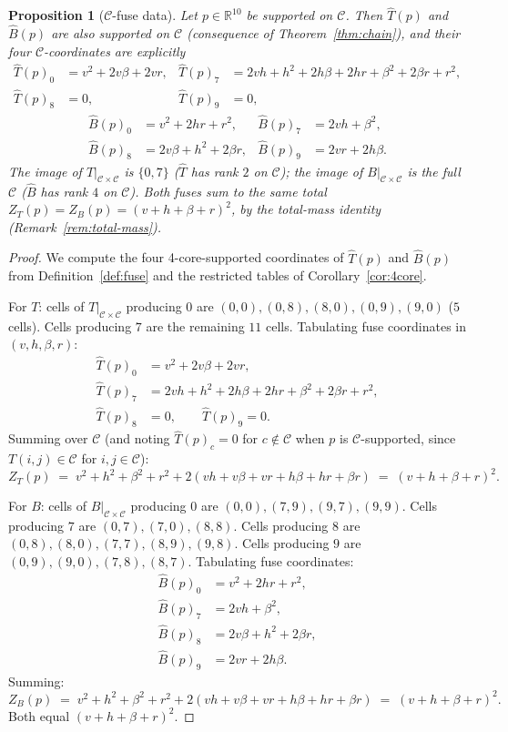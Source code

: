 \documentclass[11pt,reqno]{amsart}
\theoremstyle{plain}
\newtheorem{proposition}[theorem]{Proposition}
\theoremstyle{definition}
\theoremstyle{remark}
\newcommand{\R}{\mathbb{R}}
\newcommand{\Cfour}{\mathcal{C}}
\newcommand{\Tfuse}{\widehat{T}}
\newcommand{\Bfuse}{\widehat{B}}
\begin{document}
\begin{proposition}[$\Cfour$-fuse data]\label{prop:fuse-data}
Let $p\in\R^{10}$ be supported on $\Cfour$. Then
$\Tfuse(p)$ and $\Bfuse(p)$ are also supported on $\Cfour$
(consequence of Theorem~\ref{thm:chain}), and their four
$\Cfour$-coordinates are explicitly
\begin{align*}
\Tfuse(p)_{0} &= v^{2}+2v\beta+2vr,
   & \Tfuse(p)_{7} &= 2vh+h^{2}+2h\beta+2hr+\beta^{2}+2\beta r+r^{2},\\
\Tfuse(p)_{8} &= 0,
   & \Tfuse(p)_{9} &= 0,
\end{align*}
\begin{align*}
\Bfuse(p)_{0} &= v^{2}+2hr+r^{2},
   & \Bfuse(p)_{7} &= 2vh+\beta^{2},\\
\Bfuse(p)_{8} &= 2v\beta+h^{2}+2\beta r,
   & \Bfuse(p)_{9} &= 2vr+2h\beta.
\end{align*}
The image of $T\big|_{\Cfour\times\Cfour}$ is $\{0,7\}$
($\Tfuse$ has rank $2$ on $\Cfour$); the image of
$B\big|_{\Cfour\times\Cfour}$ is the full $\Cfour$ ($\Bfuse$ has
rank $4$ on $\Cfour$). Both fuses sum to the same total
$Z_{T}(p) = Z_{B}(p) = (v+h+\beta+r)^{2}$, by the total-mass
identity (Remark~\ref{rem:total-mass}).
\end{proposition}

\begin{proof}
We compute the four 4-core-supported coordinates of $\Tfuse(p)$
and $\Bfuse(p)$ from Definition~\ref{def:fuse} and the restricted
tables of Corollary~\ref{cor:4core}.

For $T$: cells of $T\big|_{\Cfour\times\Cfour}$ producing $0$ are
$(0,0),(0,8),(8,0),(0,9),(9,0)$ ($5$ cells). Cells producing $7$
are the remaining $11$ cells. Tabulating fuse coordinates in
$(v,h,\beta,r)$:
\begin{align*}
\Tfuse(p)_{0}&=v^{2}+2v\beta+2vr,\\
\Tfuse(p)_{7}&=2vh+h^{2}+2h\beta+2hr+\beta^{2}+2\beta r+r^{2},\\
\Tfuse(p)_{8}&=0,\qquad \Tfuse(p)_{9}=0.
\end{align*}
Summing over $\Cfour$ (and noting $\Tfuse(p)_{c}=0$ for
$c\notin\Cfour$ when $p$ is $\Cfour$-supported, since $T(i,j)\in\Cfour$
for $i,j\in\Cfour$):
\[
Z_{T}(p)\;=\;v^{2}+h^{2}+\beta^{2}+r^{2}+2(vh+v\beta+vr+h\beta+hr+\beta r)\;=\;(v+h+\beta+r)^{2}.
\]

For $B$: cells of $B\big|_{\Cfour\times\Cfour}$ producing $0$ are
$(0,0),(7,9),(9,7),(9,9)$. Cells producing $7$ are
$(0,7),(7,0),(8,8)$. Cells producing $8$ are
$(0,8),(8,0),(7,7),(8,9),(9,8)$. Cells producing $9$ are
$(0,9),(9,0),(7,8),(8,7)$. Tabulating fuse coordinates:
\begin{align*}
\Bfuse(p)_{0}&=v^{2}+2hr+r^{2},\\
\Bfuse(p)_{7}&=2vh+\beta^{2},\\
\Bfuse(p)_{8}&=2v\beta+h^{2}+2\beta r,\\
\Bfuse(p)_{9}&=2vr+2h\beta.
\end{align*}
Summing:
\[
Z_{B}(p)\;=\;v^{2}+h^{2}+\beta^{2}+r^{2}+2(vh+v\beta+vr+h\beta+hr+\beta r)\;=\;(v+h+\beta+r)^{2}.
\]
Both equal $(v+h+\beta+r)^{2}$.
\end{proof}
\end{document}

